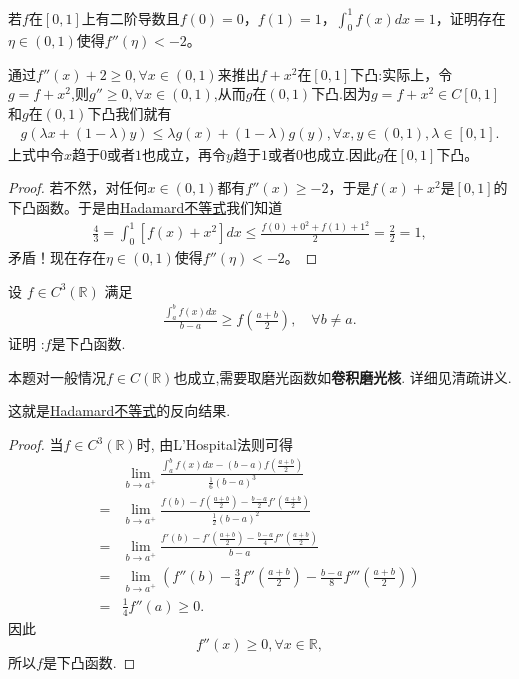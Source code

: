 \documentclass[../../main.tex]{subfiles}
\begin{document}
\begin{example}
若$f$在$[0,1]$上有二阶导数且$f(0) = 0$，$f(1) = 1$，$\int_0^1 f(x)dx = 1$，证明存在$\eta\in(0,1)$使得$f''(\eta)< -2$。
\end{example}
\begin{remark}
通过$f''(x)+2\geq 0,\forall x\in(0,1)$来推出$f + x^2$在$[0,1]$下凸:实际上，令$g=f+x^2$,则$g''\geq 0,\forall x\in(0,1)$,从而$g$在$(0,1)$下凸.因为$g = f + x^2\in C[0,1]$和$g$在$(0,1)$下凸我们就有
\begin{align*}
g(\lambda x + (1 - \lambda)y)\leq\lambda g(x) + (1 - \lambda)g(y),\forall x,y\in(0,1),\lambda\in[0,1].
\end{align*}
上式中令$x$趋于$0$或者$1$也成立，再令$y$趋于$1$或者$0$也成立.因此$g$在$[0,1]$下凸。 
\end{remark}
\begin{proof}
若不然，对任何$x\in(0,1)$都有$f''(x)\geq -2$，于是$f(x) + x^2$是$[0,1]$的下凸函数。于是由\hyperref[theorem:Hadamard不等式]{Hadamard不等式}我们知道
\begin{align*}
\frac{4}{3}=\int_0^1 [f(x) + x^2]dx\leq\frac{f(0) + 0^2 + f(1) + 1^2}{2}=\frac{2}{2}=1,
\end{align*}
矛盾！现在存在$\eta\in(0,1)$使得$f''(\eta)< -2$。
\end{proof}

\begin{proposition}
设 \(f\in C^3(\mathbb{R})\) 满足
\begin{align*}
\frac{\int_{a}^{b}f(x)dx}{b - a} \geqslant f\left(\frac{a + b}{2}\right),\quad \forall b\neq a.
\end{align*}
证明 :\(f\)是下凸函数. 
\end{proposition}
\begin{remark}
本题对一般情况$f\in C(\mathbb{R})$也成立,需要取磨光函数如\textbf{卷积磨光核}. 详细见清疏讲义.
\end{remark}
\begin{note}
这就是\hyperref[theorem:Hadamard不等式]{Hadamard不等式}的反向结果.
\end{note}
\begin{proof}
当\(f\in C^{3}(\mathbb{R})\)时, 由L'Hospital法则可得
\begin{align*}
&\lim_{b\to a^+}\frac{\int_{a}^{b}f(x)dx - (b - a)f(\frac{a + b}{2})}{\frac{1}{6}(b - a)^3}\\
=&\lim_{b\to a^+}\frac{f(b)-f(\frac{a + b}{2})-\frac{b - a}{2}f'(\frac{a + b}{2})}{\frac{1}{2}(b - a)^2}\\
=&\lim_{b\to a^+}\frac{f'(b)-f'(\frac{a + b}{2})-\frac{b - a}{4}f''(\frac{a + b}{2})}{b - a}\\
=&\lim_{b\to a^+}\left(f''(b)-\frac{3}{4}f''\left(\frac{a + b}{2}\right)-\frac{b - a}{8}f''' \left(\frac{a + b}{2}\right)\right)\\
=&\frac{1}{4}f''(a)\geqslant 0.
\end{align*}
因此
\[f''(x)\geqslant 0,\forall x\in \mathbb{R},\]
所以\(f\)是下凸函数.
\end{proof}
\end{document}
